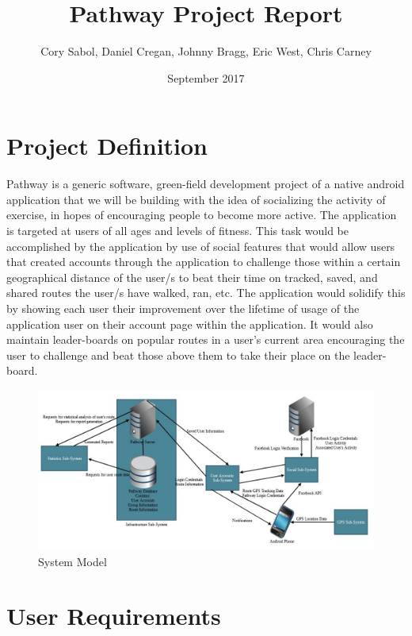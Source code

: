 ﻿\documentclass{article}
\title{Pathway Project Report}
\author{Cory Sabol, Daniel Cregan, Johnny Bragg, Eric West, Chris Carney}
\date{September 2017}
\begin{document}
\maketitle

\pagebreak

\tableofcontents

\pagebreak

\section{Project Definition}
Pathway is a generic software, green-field development project of a native android application that we will be building with the idea of socializing the activity of exercise, in hopes of encouraging people to become more active. The application is targeted at users of all ages and levels of fitness. This task would be accomplished by the application by use of social features that would allow users that created accounts through the application to challenge those within a certain geographical distance of the user/s to beat their time on tracked, saved, and shared routes the user/s have walked, ran, etc. The application would solidify this by showing each user their improvement over the lifetime of usage of the application user on their account page within the application. It would also maintain leader-boards on popular routes in a user's current area encouraging the user to challenge and beat those above them to take their place on the leader-board.
\begin{figure}[!htb]
    \centering
    \includegraphics[width=\textwidth]{system_model.jpg}
    \caption{System Model}
    \label{fig:my_label}
\end{figure}

\pagebreak

\section{User Requirements}
\end{document}
